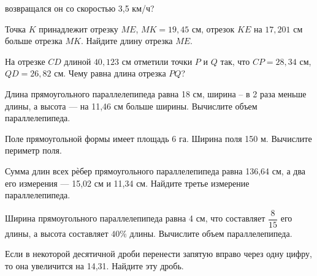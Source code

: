 \begin{class}[number=3]
\begin{listofex}
		возвращался он со скоростью 3,5 км/ч?
		\item Точка \( K \) принадлежит отрезку \( ME \), \( MK = 19,45 \) см, отрезок \( KE \) на \( 17,201 \) см больше отрезка \( MK \). Найдите длину отрезка \( ME \). 
		\item На отрезке \( CD \) длиной \( 40,123 \) см отметили точки \( P \) и \( Q \) так, что \( CP = 28,34 \) см, \( QD =26,82 \) см. Чему равна длина отрезка \( PQ \)?
		\item Длина прямоугольного параллелепипеда равна 18 см, ширина – в 2 раза
		меньше длины, а высота --- на 11,46 см больше ширины. Вычислите объем
		параллелепипеда.
		\item Поле прямоугольной формы имеет площадь 6 га. Ширина поля 150 м.
		Вычислите периметр поля.
		\item Сумма длин всех рѐбер прямоугольного параллелепипеда равна 136,64 см, а два его измерения --- 15,02 см и 11,34 см. Найдите третье измерение параллелепипеда.
		\item Ширина прямоугольного параллелепипеда равна 4 см, что составляет  \( \dfrac{8}{15} \) его длины, а высота составляет \( 40\% \) длины. Вычислите объем параллелепипеда.
		\item Если в некоторой десятичной дроби перенести запятую вправо через одну цифру, то она увеличится на 14,31. Найдите эту дробь.
		
	\end{listofex}
\end{class}

